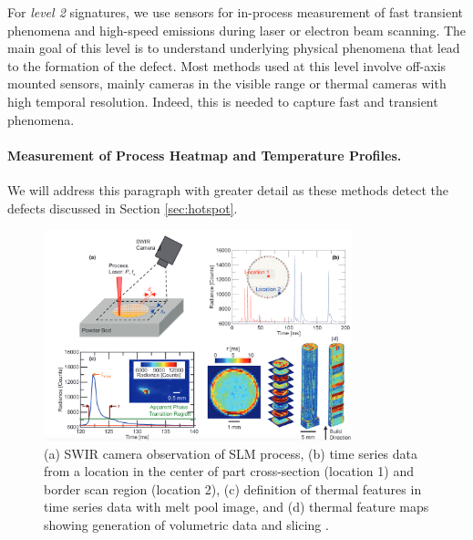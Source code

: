 For \emph{level 2} signatures, we use sensors for in-process measurement of fast transient phenomena and high-speed emissions during laser or electron beam scanning. The main goal of this level is to understand underlying physical phenomena that lead to the formation of the defect. Most methods used at this level involve off-axis mounted sensors, mainly cameras in the visible range or thermal cameras with high temporal resolution. Indeed, this is needed to capture fast and transient phenomena. 
\paragraph{Measurement of Process Heatmap and Temperature Profiles.} We will address this paragraph with greater detail as these methods detect the defects discussed in Section \ref{sec:hotspot}.
\begin{figure}
    \centering
    \includegraphics[width=0.8\textwidth]{Images/voxel.png}
    \caption[Example of voxel thermic reconstruction.]{(a) SWIR camera observation of SLM process, (b) time series data from a location in the center of part cross-section (location 1) and border scan region (location 2), (c) definition of thermal features in time series data with melt pool image, and (d) thermal feature maps showing generation of volumetric data and slicing \cite{lough_-situ_2019}.}
    \label{fig:voxel}
\end{figure}
